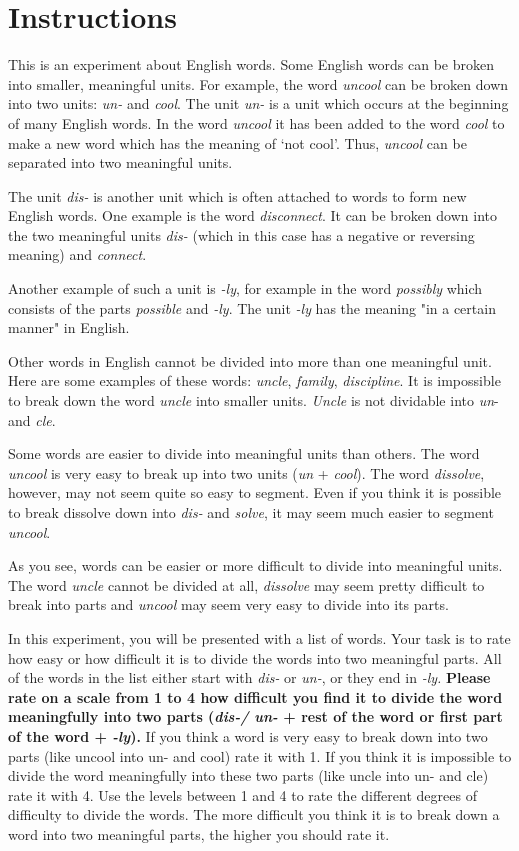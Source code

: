 \section{Instructions}
 This is an experiment about English words. Some English words can be broken into smaller, meaningful units.
For example, the word \textit{uncool} can be broken down into two units: \textit{un-} and \textit{cool}. The unit \textit{{un-} }is a unit which occurs at the beginning of many English words. In the word \textit{uncool} it has been added to the word \textit{cool} to make a new word which has the meaning of ‘not cool’. Thus, \textit{uncool} can be separated into two meaningful units.

The unit \textit{dis-} is another unit which is often attached to words to form new English words. One example is the word \textit{disconnect}. It can be broken down into the two meaningful units \textit{{dis-} }(which in this case has a negative or reversing meaning) and \textit{connect}.

Another example of such a unit is \textit{-ly}, for example in the word \textit{possibly} which consists of the parts \textit{possible} and \textit{-ly}.  The unit\textit{ {-ly} }has the meaning "in a certain manner" in English.

Other words in English cannot be divided into more than one meaningful unit. Here are some examples of these words: \textit{uncle}, \textit{family}, \textit{discipline}. It is impossible to break down the word \textit{uncle} into smaller units. \textit{Uncle} is not dividable into \textit{un}- and \textit{cle}.

Some words are easier to divide into meaningful units than others. The word \textit{uncool} is very easy to break up into two units (\textit{un} + \textit{cool}). The word \textit{dissolve}, however, may not seem quite so easy to segment. Even if you think it is possible to break dissolve down into \textit{dis-} and \textit{solve}, it may seem much easier to segment \textit{uncool}.

As you see, words can be easier or more difficult to divide into meaningful units. The word \textit{uncle} cannot be divided at all, \textit{dissolve} may seem pretty difficult to break into parts and \textit{uncool} may seem very easy to divide into its parts. 

In this experiment, you will be presented with a list of words. Your task is to rate how easy or how difficult it is to divide the words into two meaningful parts. All of the words in the list either start with \textit{dis-} or \textit{un-}, or they end in \textit{{-ly}.} \textbf{Please rate on a scale from 1 to 4 how difficult you find it to divide the word meaningfully into two parts (\textit{{dis-}/ un-} + rest of the word or first part of the word + \textit{-ly}). }If you think a word is very easy to break down into two parts (like uncool into {un-} and cool) rate it with 1.  If you think it is impossible to divide the word meaningfully into these two parts (like uncle into {un-} and cle) rate it with 4. Use the levels between 1 and 4 to rate the different degrees of difficulty to divide the words. The more difficult you think it is to break down a word into two meaningful parts, the higher you should rate it.


